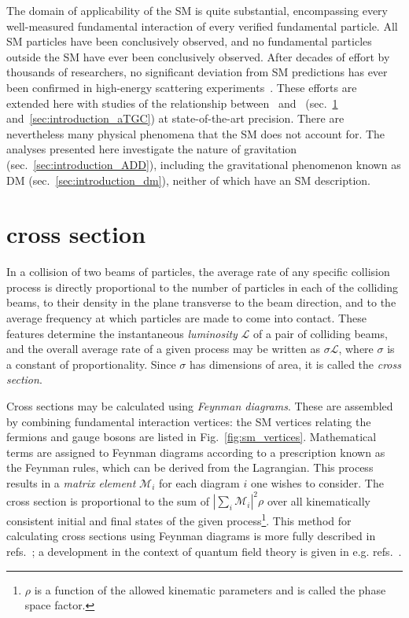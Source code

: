\documentclass[oneside, letterpaper, 12pt, oldfontcommands]{memoir}
\begin{document}
The domain of applicability of the SM is quite substantial, encompassing
every well-measured fundamental interaction of every verified fundamental particle. All SM particles have been conclusively observed,
and no fundamental particles outside the SM have ever been conclusively observed. After decades of effort by thousands of researchers,
no significant deviation from SM predictions has ever been confirmed in high-energy scattering experiments~\cite{ref:CahnGoldhaber, ref:PDG}.
These efforts are extended here with studies of the relationship between \PZ\ and \Pgamma\ (sec.~\ref{sec:introduction_znng} and~\ref{sec:introduction_aTGC}) at state-of-the-art precision.
There are nevertheless many physical phenomena that the SM does not account for.
The analyses presented here investigate the nature of gravitation (sec.~\ref{sec:introduction_ADD}),
including the gravitational phenomenon known as DM (sec.~\ref{sec:introduction_dm}), neither of which have an SM description.

\section{\texorpdfstring{\zinvg}{Z(νν)γ} cross section} \label{sec:introduction_znng}
In a collision of two beams of particles, the average rate of any specific collision process is directly proportional to the
number of particles in each of the colliding beams, to their density in the plane transverse to the beam direction, and to the average
frequency at which particles are made to come into contact. These features determine the instantaneous \textit{luminosity} $\mathcal{L}$ of a pair
of colliding beams, and the overall average rate of a given process may be written as $\sigma \mathcal{L}$, where $\sigma$
is a constant of proportionality. Since $\sigma$ has dimensions of area, it is called the \textit{cross section}.

Cross sections may be calculated using \textit{Feynman diagrams}. These are
assembled by combining fundamental interaction vertices: the SM vertices relating the fermions and gauge bosons are listed in Fig.~\ref{fig:sm_vertices}.
Mathematical terms are assigned to Feynman diagrams according to a prescription known as the Feynman rules, which can be derived from the Lagrangian.
This process results in a \textit{matrix element} $\mathcal{M}_{i}$ for each diagram $i$ one wishes to consider. The cross section is proportional to the sum of $|\sum_{i}{\mathcal{M}_{i}}|^{2}\rho$
over all kinematically consistent initial and final states of the given process\footnote{$\rho$ is a function of the allowed kinematic parameters and is called the phase space
factor.}. This method for calculating cross sections using Feynman diagrams is more fully described in refs.~\cite{ref:HalzenMartin, ref:BargerPhillips};
a development in the context of quantum field theory is given in e.g. refs.~\cite{ref:PeskinSchroeder, ref:Srednicki, ref:Schwartz}.
\end{document}
